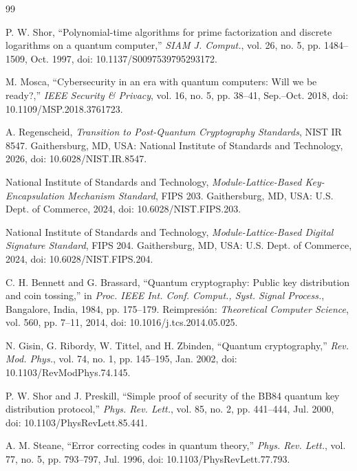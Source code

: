 \documentclass[conference]{IEEEtran}
\begin{document}
\begin{thebibliography}{99}

 P. W. Shor, ``Polynomial-time algorithms for prime
factorization and discrete logarithms on a quantum computer,'' \emph{SIAM J.
Comput.}, vol. 26, no. 5, pp. 1484--1509, Oct. 1997, doi:
10.1137/S0097539795293172.

 M. Mosca, ``Cybersecurity in an era with quantum computers:
Will we be ready?,'' \emph{IEEE Security \& Privacy}, vol. 16, no. 5, pp.
38--41, Sep.--Oct. 2018, doi: 10.1109/MSP.2018.3761723.

 A. Regenscheid, \emph{Transition to Post-Quantum
Cryptography Standards}, NIST IR 8547. Gaithersburg, MD, USA: National Institute
of Standards and Technology, 2026, doi: 10.6028/NIST.IR.8547.

 National Institute of Standards and Technology,
\emph{Module-Lattice-Based Key-Encapsulation Mechanism Standard}, FIPS 203.
Gaithersburg, MD, USA: U.S. Dept. of Commerce, 2024, doi:
10.6028/NIST.FIPS.203.

 National Institute of Standards and Technology,
\emph{Module-Lattice-Based Digital Signature Standard}, FIPS 204. Gaithersburg,
MD, USA: U.S. Dept. of Commerce, 2024, doi: 10.6028/NIST.FIPS.204.

 C. H. Bennett and G. Brassard, ``Quantum cryptography:
Public key distribution and coin tossing,'' in \emph{Proc. IEEE Int. Conf.
Comput., Syst. Signal Process.}, Bangalore, India, 1984, pp. 175--179.
Reimpresión: \emph{Theoretical Computer Science}, vol. 560, pp. 7--11, 2014, doi:
10.1016/j.tcs.2014.05.025.

 N. Gisin, G. Ribordy, W. Tittel, and H. Zbinden, ``Quantum
cryptography,'' \emph{Rev. Mod. Phys.}, vol. 74, no. 1, pp. 145--195, Jan. 2002,
doi: 10.1103/RevModPhys.74.145.

 P. W. Shor and J. Preskill, ``Simple proof of security of the
BB84 quantum key distribution protocol,'' \emph{Phys. Rev. Lett.}, vol. 85, no.
2, pp. 441--444, Jul. 2000, doi: 10.1103/PhysRevLett.85.441.

 A. M. Steane, ``Error correcting codes in quantum theory,''
\emph{Phys. Rev. Lett.}, vol. 77, no. 5, pp. 793--797, Jul. 1996, doi:
10.1103/PhysRevLett.77.793.


\end{thebibliography}
\end{document}
